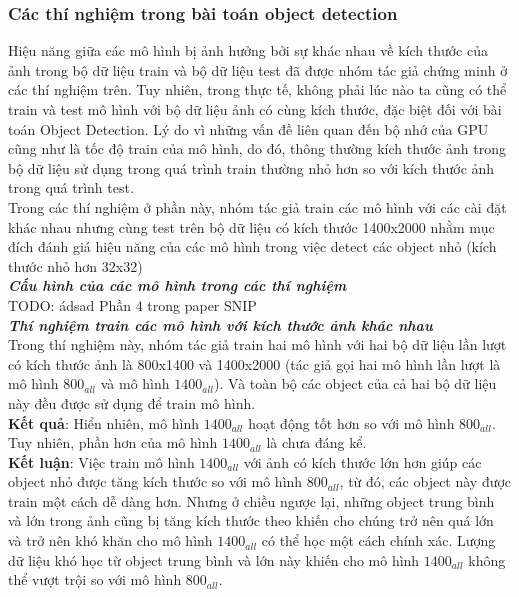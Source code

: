 {    \subsubsection{Các thí nghiệm trong bài toán object detection}
    Hiệu năng giữa các mô hình bị ảnh hưởng bởi sự khác nhau về kích thước của ảnh trong bộ dữ liệu train và bộ dữ liệu test đã được nhóm tác giả chứng minh ở các thí nghiệm trên.
    Tuy nhiên, trong thực tế, không phải lúc nào ta cũng có thể train và test mô hình với bộ dữ liệu ảnh có cùng kích thước, đặc biệt đối với bài toán Object Detection.
    Lý do vì những vấn đề liên quan đến bộ nhớ của GPU cũng như là tốc độ train của mô hình, do đó, thông thường kích thước ảnh trong bộ dữ liệu sử dụng trong quá trình train thường nhỏ hơn so với kích thước ảnh trong quá trình test. \\
    Trong các thí nghiệm ở phần này, nhóm tác giả train các mô hình với các cài đặt khác nhau nhưng cùng test trên bộ dữ liệu có kích thước 1400x2000 nhằm mục đích đánh giá hiệu năng của các mô hình trong việc detect các object nhỏ (kích thước nhỏ hơn 32x32) \\

    \noindent
    \textbf{\textit{Cấu hình của các mô hình trong các thí nghiệm}} \\
    TODO: ádsad Phần 4 trong paper SNIP \\

    \noindent
    \textbf{\textit{Thí nghiệm train các mô hình với kích thước ảnh khác nhau}} \\
    Trong thí nghiệm này, nhóm tác giả train hai mô hình với hai bộ dữ liệu lần lượt có kích thước ảnh là 800x1400 và 1400x2000 (tác giả gọi hai mô hình lần lượt là mô hình ${800}_{all}$ và mô hình ${1400}_{all}$).
    Và toàn bộ các object của cả hai bộ dữ liệu này đều được sử dụng để train mô hình. \\
    \textbf{Kết quả}: Hiển nhiên, mô hình ${1400}_{all}$ hoạt động tốt hơn so với mô hình ${800}_{all}$.
    Tuy nhiên, phần hơn của mô hình ${1400}_{all}$ là chưa đáng kể. \\
    \textbf{Kết luận}: Việc train mô hình ${1400}_{all}$ với ảnh có kích thước lớn hơn giúp các object nhỏ được tăng kích thước so với mô hình ${800}_{all}$, từ đó, các object này được train một cách dễ dàng hơn.
    Nhưng ở chiều ngược lại, những object trung bình và lớn trong ảnh cũng bị tăng kích thước theo khiến cho chúng trở nên quá lớn và trở nên khó khăn cho mô hình ${1400}_{all}$ có thể học một cách chính xác.
    Lượng dữ liệu khó học từ object trung bình và lớn này khiến cho mô hình ${1400}_{all}$ không thể vượt trội so với mô hình ${800}_{all}$. \\

}
